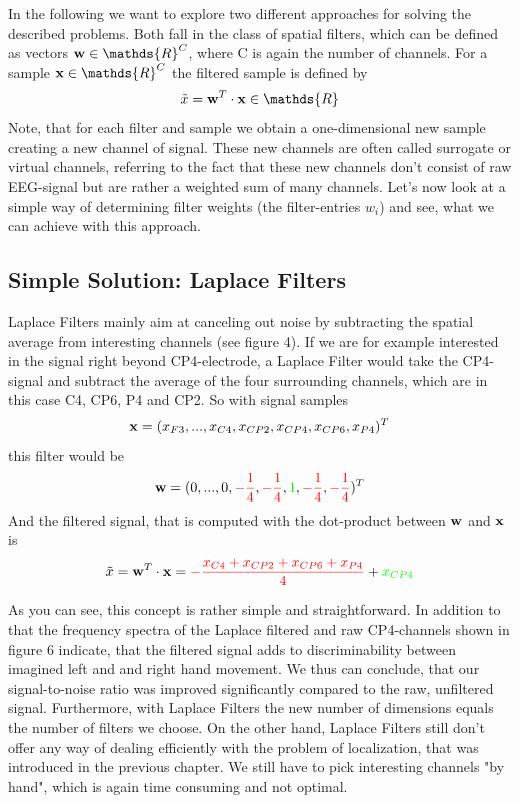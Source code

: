 \documentclass[12pt,twoside,twocolumn]{article}
\begin{document}
In the following we want to explore two different approaches for solving the described problems. Both fall in the class of spatial filters, which can be defined as vectors ${\bf w} \in \mathds{R}^C$, where C is again the number of channels. For a sample ${\bf x} \in \mathds{R}^C$ the filtered sample is defined by 
\begin{equation}
\tilde{x} = {\bf w}^T \cdot {\bf x} \in \mathds{R}
\end{equation}
Note, that for each filter and sample we obtain a one-dimensional new sample creating a new channel of signal. These new channels are often called surrogate or virtual channels, referring to the fact that these new channels don't consist of raw EEG-signal but are rather a weighted sum of many channels.
Let's now look at a simple way of determining filter weights (the filter-entries $w_i$) and see, what we can achieve with this approach.

\subsection{Simple Solution: Laplace Filters}
Laplace Filters mainly aim at canceling out noise by subtracting the spatial average from interesting channels (see figure 4). If we are for example interested in the signal right beyond CP4-electrode, a Laplace Filter would take the CP4-signal and subtract the average of the four surrounding channels, which are in this case C4, CP6, P4 and CP2. So with signal samples
\begin{equation}
{\bf x} = (x_{F3}, ..., x_{C4}, x_{CP2}, x_{CP4}, x_{CP6}, x_{P4})^T
\end{equation}
this filter would be 
\begin{equation}
{\bf w} = (0, ..., 0,\textcolor{red}{-\frac{1}{4}}, \textcolor{red}{-\frac{1}{4}}, \textcolor{green}{1}, \textcolor{red}{-\frac{1}{4}}, \textcolor{red}{-\frac{1}{4}})^T
\end{equation} 
And the filtered signal, that is computed with the dot-product between ${\bf w}$ and ${\bf x}$ is
\begin{equation}
\tilde{x} = {\bf w}^T \cdot {\bf x} =  \textcolor{red}{-\frac{x_{C4} + x_{CP2} + x_{CP6} + x_{P4}}{4}} + \textcolor{green}{x_{CP4}}
\end{equation}

As you can see, this concept is rather simple and straightforward. In addition to that the frequency spectra of the Laplace filtered and raw CP4-channels shown in figure 6 indicate, that the filtered signal adds to discriminability between imagined left and and right hand movement. We thus can conclude, that our signal-to-noise ratio was improved significantly compared to the raw, unfiltered signal. Furthermore, with Laplace Filters the new number of dimensions equals the number of filters we choose. On the other hand, Laplace Filters still don't offer any way of dealing efficiently with the problem of localization, that was introduced in the previous chapter. We still have to pick interesting channels "by hand", which is again time consuming and not optimal. 
\end{document}
